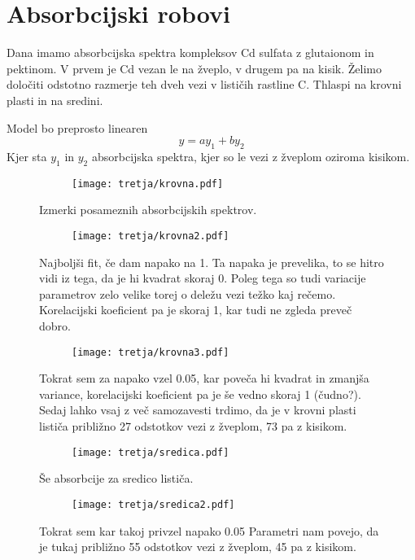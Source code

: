 \documentclass{article}
\begin{document}
\section{Absorbcijski robovi}

Dana imamo absorbcijska spektra kompleksov Cd sulfata z glutaionom in pektinom. V prvem je Cd vezan le na žveplo,
v drugem pa na kisik. Želimo določiti odstotno razmerje teh dveh vezi v lističih rastline C. Thlaspi na krovni plasti in na sredini.

Model bo preprosto linearen
\begin{equation*}
y = a y_1 + b y_2
\end{equation*}
Kjer sta $y_1$ in $y_2$ absorbcijska spektra, kjer so le vezi z žveplom oziroma kisikom.

\begin{figure}[H]
\begin{subfigure}{\textwidth}
\texttt{[image: tretja/krovna.pdf]}
\end{subfigure}
\caption*{Izmerki posameznih absorbcijskih spektrov.}
\end{figure}

\begin{figure}[H]
\begin{subfigure}{\textwidth}
\texttt{[image: tretja/krovna2.pdf]}
\end{subfigure}
\caption*{Najboljši fit, če dam napako na 1. Ta napaka je prevelika, to se hitro vidi iz tega, da je hi kvadrat skoraj 0. Poleg tega so tudi variacije parametrov zelo velike torej o deležu vezi težko kaj rečemo. Korelacijski koeficient pa je skoraj 1, kar tudi ne zgleda preveč dobro.}
\end{figure}

\begin{figure}[H]
\begin{subfigure}{\textwidth}
\texttt{[image: tretja/krovna3.pdf]}
\end{subfigure}
\caption*{Tokrat sem za napako vzel 0.05, kar poveča hi kvadrat in zmanjša variance, korelacijski koeficient pa je še  vedno skoraj 1 (čudno?). Sedaj lahko vsaj z več samozavesti trdimo, da je v krovni plasti lističa približno 27 odstotkov vezi z žveplom, 73 pa z kisikom.}
\end{figure}

\begin{figure}[H]
\begin{subfigure}{\textwidth}
\texttt{[image: tretja/sredica.pdf]}
\end{subfigure}
\caption*{Še absorbcije za sredico lističa.}
\end{figure}

\begin{figure}[H]
\begin{subfigure}{\textwidth}
\texttt{[image: tretja/sredica2.pdf]}
\end{subfigure}
\caption*{Tokrat sem kar takoj privzel napako 0.05 Parametri nam povejo, da je tukaj približno 55 odstotkov vezi z žveplom, 45 pa z kisikom.}
\end{figure}
\end{document}
